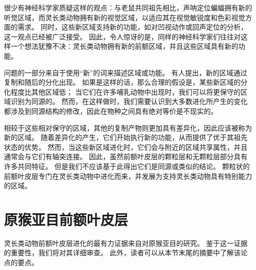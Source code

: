 很少有神经科学家质疑这样的观点：与老鼠共同祖先相比，声呐定位蝙蝠拥有新的听觉区域，而灵长类动物拥有新的视觉区域，以适应其在视觉敏锐度和色彩视觉方面的需求。
同时，这些新区域支持新的功能，如对凹视动作或回声定位的分析，这一观点已经被广泛接受。
因此，令人惊讶的是，同样的神经科学家们往往对这样一个想法犹豫不决：灵长类动物拥有新的前额区域，并且这些区域具有新的功能。


问题的一部分来自于使用“新”的词来描述区域或功能。
有人提出，新的区域通过复制和随后的分化出现\cite{krubitzer2000arealization}。
如果是这样的话，那么合理的假设是，某些新区域的分化程度比其他区域低；
当它们在许多哺乳动物中出现时，我们可以将更保守的区域识别为同源的。
然而，在这样做时，我们需要认识到大多数进化所产生的变化都涉及到同源结构的修改，因此在物种之间具有绝对等价是不现实的。


相较于这些相对保守的区域，其他的复制产物则更加具有差异化，因此应该被称为新的区域。
随着差异化的产生，它们开始执行新的功能，从而提供了优于其祖先状态的优势。
然而，当这些新区域进化时，它们会与附近的区域共享属性，并且通常会与它们有轴突连接。
因此，虽然前额叶皮层的颗粒层和无颗粒层部分具有许多共同特征。
但是我们不应该基于此得出它们是同源或类似的结论。
颗粒状的前额叶皮层专门在灵长类动物中进化而来，并发展为支持灵长类动物具有特别能力的区域。


\section{原猴亚目前额叶皮层}

灵长类动物前额叶皮层进化的最有力证据来自对原猴亚目的研究。
鉴于这一证据的重要性，我们将对其详细审查。
此外，读者可以从本节末尾的摘要中了解该论点的要点。


